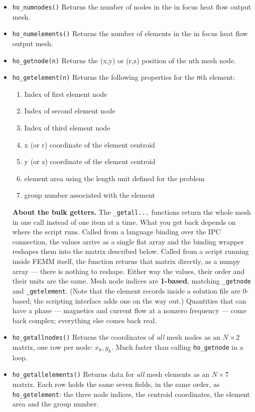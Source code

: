 \begin{itemize}
\item{\tt ho\_numnodes()} Returns the number of nodes in the in focus heat flow output mesh.
\item{\tt ho\_numelements()} Returns the number of elements in the in focus heat flow output mesh.
\item{\tt ho\_getnode(n)} Returns the (x,y) or (r,z) position of the nth mesh node.
\item{\tt ho\_getelement(n)} Returns the following properties for the {\tt n}th element:
    \begin{enumerate}
        \item Index of first element node
        \item Index of second element node
        \item Index of third element node
        \item x (or r) coordinate of the element centroid
        \item y (or z) coordinate of the element centroid
        \item element area using the length unit defined for the problem
        \item group number associated with the element
    \end{enumerate}
\medskip\noindent
{\bf About the bulk getters.}  The {\tt *\_getall...} functions return the whole
mesh in one call instead of one item at a time.  What you get back depends on
where the script runs.  Called from a language binding over the IPC connection,
the values arrive as a single flat array and the binding wrapper reshapes them
into the matrix described below.  Called from a script running inside FEMM
itself, the function returns that matrix directly, as a numpy array --- there is
nothing to reshape.  Either way the values, their order and their units are the
same.  Mesh node indices are {\bf 1-based}, matching {\tt *\_getnode} and
{\tt *\_getelement}.  (Note that the element records inside a solution file are
0-based; the scripting interface adds one on the way out.)  Quantities that can
have a phase --- magnetics and current flow at a nonzero frequency --- come back
complex; everything else comes back real.
\medskip

\item{\tt ho\_getallnodes()} Returns the coordinates of {\em all} mesh nodes as
an $N \times 2$ matrix, one row per node: $x_k, y_k$.  Much faster than calling
{\tt ho\_getnode} in a loop.

\item{\tt ho\_getallelements()} Returns data for {\em all} mesh elements as an
$N \times 7$ matrix.  Each row holds the same seven fields, in the same order,
as {\tt ho\_getelement}: the three node indices, the centroid coordinates, the
element area and the group number.


\end{itemize}
